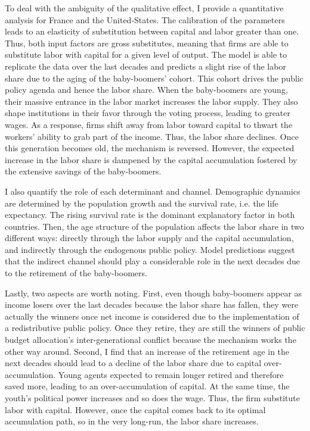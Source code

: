 To deal with the ambiguity of the qualitative effect, I provide a quantitative analysis for France and the United-States. The calibration of the parameters leads to an elasticity of substitution between capital and labor greater than one. Thus, both input factors are gross substitutes, meaning that firms are able to substitute labor with capital for a given level of output. The model is able to replicate the data over the last decades and predicts a slight rise of the labor share due to the aging of the baby-boomers' cohort. This cohort drives the public policy agenda and hence the labor share. When the baby-boomers are young, their massive entrance in the labor market increases the labor supply. They also shape institutions in their favor through the voting process, leading to greater wages. As a response, firms shift away from labor toward capital to thwart the workers' ability to grab part of the income. Thus, the labor share declines. Once this generation becomes old, the mechanism is reversed. However, the expected increase in the labor share is dampened by the capital accumulation fostered by the extensive savings of the baby-boomers. 

I also quantify the role of each determinant and channel. 
Demographic dynamics are determined by the population growth and the survival rate, i.e. the life expectancy. The rising survival rate is the dominant explanatory factor in both countries. Then, the age structure of the population affects the labor share in two different ways: directly through the labor supply and the capital accumulation, and indirectly through the endogenous public policy. Model predictions suggest that the indirect channel should play a considerable role in the next decades due to the retirement of the baby-boomers.

Lastly, two aspects are worth noting. First, even though baby-boomers appear as income losers over the last decades because the labor share has fallen, they were actually the winners once net income is considered due to the implementation of a redistributive public policy. Once they retire, they are still the winners of public budget allocation's inter-generational conflict because the mechanism works the other way around.
Second, I find that an increase of the retirement age in the next decades should lead to a decline of the labor share due to capital over-accumulation.
Young agents expected to remain longer retired and therefore saved more, leading to an over-accumulation of capital. At the same time, the youth's political power increases and so does the wage. Thus, the firm substitute labor with capital. However, once the capital comes back to its optimal accumulation path, so in the very long-run, the labor share increases.

